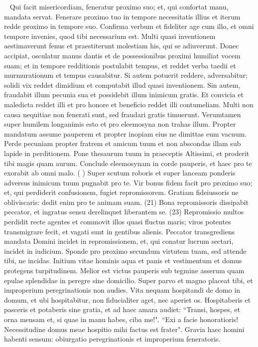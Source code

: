 \begin{biblechapter}    
\verse Qui facit misericordiam, feneratur proximo suo; et, qui confortat manu, mandata servat. 
\verse Fenerare proximo tuo in tempore necessitatis illius et iterum redde proximo in tempore suo. 
\verse Confirma verbum et fideliter age cum illo, et omni tempore invenies, quod tibi necessarium est. 
\verse Multi quasi inventionem aestimaverunt fenus et praestiterunt molestiam his, qui se adiuverunt. 
\verse Donec accipiat, osculatur manus dantis et de possessionibus proximi humiliat vocem suam; 
\verse et in tempore redditionis postulabit tempus, et reddet verba taedii et murmurationum et tempus causabitur. 
\verse Si autem potuerit reddere, adversabitur; solidi vix reddet dimidium et computabit illud quasi inventionem. 
\verse Sin autem, fraudabit illum pecunia sua et possidebit illum inimicum gratis. 
\verse Et convicia et maledicta reddet illi et pro honore et beneficio reddet illi contumeliam. 
\verse Multi non causa nequitiae non fenerati sunt, sed fraudari gratis timuerunt. 
\verse Verumtamen super humilem longanimis esto et pro eleemosyna non trahas illum. 
\verse Propter mandatum assume pauperem et propter inopiam eius ne dimittas eum vacuum. 
\verse Perde pecuniam propter fratrem et amicum tuum et non abscondas illam sub lapide in perditionem. 
\verse Pone thesaurum tuum in praeceptis Altissimi, et proderit tibi magis quam aurum. 
\verse Conclude eleemosynam in corde pauperis, et haec pro te exorabit ab omni malo. (
) 
\verse Super scutum roboris et super lanceam ponderis adversus inimicum tuum pugnabit pro te. 
\verse Vir bonus fidem facit pro proximo suo; et, qui perdiderit confusionem, fugiet repromissorem. 
\verse Gratiam fideiussoris ne obliviscaris: dedit enim pro te animam suam. (21) 
\verse Bona repromissoris dissipabit peccator, et ingratus sensu derelinquet liberantem se. (23) 
\verse Repromissio multos perdidit recte agentes et commovit illos quasi fluctus maris; 
\verse viros potentes transmigrare fecit, et vagati sunt in gentibus alienis. 
\verse Peccator transgrediens mandata Domini incidet in repromissionem, et, qui conatur lucrum sectari, incidet in iudicium. 
\verse Sponde pro proximo secundum virtutem tuam, sed attende tibi, ne incidas. 
\verse Initium vitae hominis aqua et panis et vestimentum et domus protegens turpitudinem. 
\verse Melior est victus pauperis sub tegmine asserum quam epulae splendidae in peregre sine domicilio. 
\verse Super parvo et magno placeat tibi, et improperium peregrinationis non audies. 
\verse Vita nequam hospitandi de domo in domum, et ubi hospitabitur, non fiducialiter aget, nec aperiet os. 
\verse Hospitaberis et pasceris et potaberis sine gratia, et ad haec amara audiet: 
\verse “Transi, hospes, et orna mensam et, si quae in manu habes, ciba me!". 
\verse “Exi a facie honoratioris! Necessitudine domus meae hospitio mihi factus est frater". 
\verse Gravia haec homini habenti sensum: obiurgatio peregrinationis et improperium feneratoris. 
\end{biblechapter}

